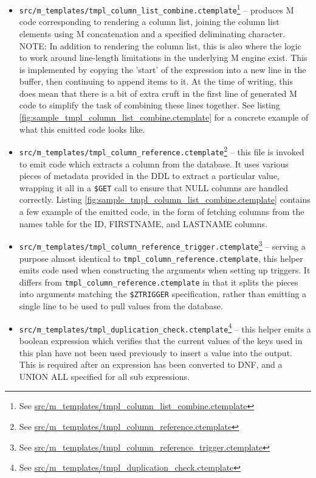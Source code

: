 \documentclass[]{article}
\def\code#1{\texttt{#1}}
\newcommand{\gitlab}[1]{\footnote{See \href{https://gitlab.com/YottaDB/DBMS/YDBOcto/blob/master/#1}{#1}}}
\begin{document}
\begin{itemize}
	\item \code{src/m\_templates/tmpl\_column\_list\_combine.ctemplate}\gitlab{src/m\_templates/tmpl\_column\_list\_combine.ctemplate} -- produces M code corresponding to rendering a column list, joining the column list elements using M concatenation and a specified deliminating character. NOTE: In addition to rendering the column list, this is also where the logic to work around line-length limitations in the underlying M engine exist. This is implemented by copying the 'start' of the expression into a new line in the buffer, then continuing to append items to it. At the time of writing, this does mean that there is a bit of extra cruft in the first line of generated M code to simplify the task of combining these lines together. See listing \ref{fig:sample_tmpl_column_list_combine.ctemplate} for a concrete example of what this emitted code looks like.
	\item \code{src/m\_templates/tmpl\_column\_reference.ctemplate}\gitlab{src/m\_templates/tmpl\_column\_reference.ctemplate} -- this file is invoked to emit code which extracts a column from the database. It uses various pieces of metadata provided in the DDL to extract a particular value, wrapping it all in a \code{\$GET} call to ensure that NULL columns are handled correctly. Listing \ref{fig:sample_tmpl_column_list_combine.ctemplate} contains a few example of the emitted code, in the form of fetching columns from the names table for the ID, FIRSTNAME, and LASTNAME columns.
	\item \code{src/m\_templates/tmpl\_column\_reference\_trigger.ctemplate}\gitlab{src/m\_templates/tmpl\_column\_reference\_trigger.ctemplate} -- serving a purpose almost identical to \code{tmpl\_column\_reference.ctemplate}, this helper emits code used when constructing the arguments when setting up triggers. It differs from \code{tmpl\_column\_reference.ctemplate} in that it splits the pieces into arguments matching the \code{\$ZTRIGGER} specification, rather than emitting a single line to be used to pull values from the database.
	\item \code{src/m\_templates/tmpl\_duplication\_check.ctemplate}\gitlab{src/m\_templates/tmpl\_duplication\_check.ctemplate} -- this helper emits a boolean expression which verifies that the current values of the keys used in this plan have not been used previously to insert a value into the output. This is required after an expression has been converted to DNF, and a UNION ALL specified for all sub expressions.

\end{itemize}
\end{document}
